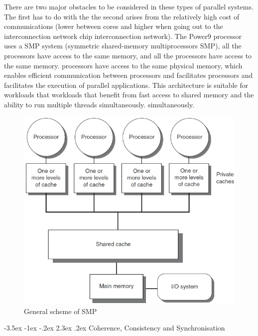 \documentclass{report}
\makeatletter
\renewcommand\chapter{\@startsection{chapter}{0}{\z@}%
    {-3.5ex \@plus -1ex \@minus -.2ex}%
    {2.3ex \@plus.2ex}%
    {\normalfont\Large\bfseries}}
\makeatother
\begin{document}
There are two major obstacles to be considered in these types of parallel systems. The first has to do with the
the second arises from the relatively high cost of communications (lower between cores and higher when going out to the interconnection network
chip interconnection network). The Power9 processor uses a SMP system (symmetric shared-memory multiprocessors SMP), all the processors have access to the same memory, and all the processors have access to the same memory.
processors have access to the same physical memory, which enables efficient communication between processors and facilitates
processors and facilitates the execution of parallel applications. This architecture is suitable for workloads that
workloads that benefit from fast access to shared memory and the ability to run multiple threads simultaneously.
simultaneously.

\begin{figure}[H]
  \centering
  \includegraphics[scale=0.47]{img/smp.jpg}
  \caption{General scheme of SMP}
  \label{fig:General scheme of SMP}
\end{figure}

\cleardoublepage

\chapter{Coherence, Consistency and Synchronisation}
\end{document}
